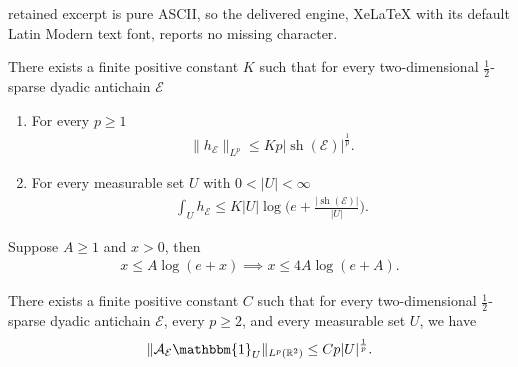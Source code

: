 \documentclass[10pt,a4paper]{amsart}
\newcommand{\ind}{\mathbbm{1}}
\newcommand{\sh}{\operatorname{sh}}
\begin{document}
retained excerpt is pure ASCII, so the delivered engine, XeLaTeX with its default Latin Modern text font, reports no missing character.
\begin{proposition} \label{height_function_bounds}
  There exists a finite positive constant $K$ such that for every
  two-dimensional $\frac{1}{2}$-sparse dyadic antichain $\mathcal{E}$
  \begin{enumerate}
    \item[(a)] For every $p \geq 1$
      \begin{align*}
        \|h_{\mathcal{E}}\|_{L^p} \leq K p |\sh(\mathcal{E})|^{\frac{1}{p}}.
      \end{align*}
    \item[(b)] For every measurable set $U$ with $0 < |U| < \infty$
      \begin{align*}
        \int_{U} h_{\mathcal{E}} \leq K |U|\log\bigg(e +
        \frac{|\sh(\mathcal{E})|}{|U|}\bigg).
      \end{align*}
  \end{enumerate}
\end{proposition}

\begin{lemma} \label{inverse}
  Suppose $A \geq 1$ and $x > 0$, then
  \begin{align*}
    x \leq A \log(e+x) \implies x \leq 4A \log(e+A).
  \end{align*}
\end{lemma}

\begin{theorem} \label{restricted_strong}
  There exists a finite positive constant $C$ such that
  for every two-dimensional $\frac{1}{2}$-sparse dyadic antichain $\mathcal{E}$,
  every $p \geq2$,
  and every measurable set $U$,
  we have
  \begin{align*}
    \|\mathcal{A}_{\mathcal{E}} \ind_U\|_{L^p(\mathbb{R}^2)}
    \leq C p|U|^{\frac{1}{p}}.
  \end{align*}
\end{theorem}
\end{document}
